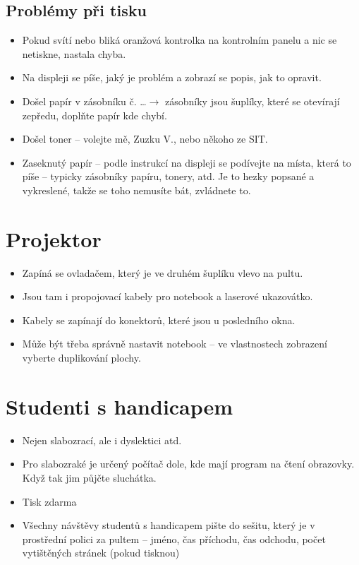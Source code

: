 \documentclass{article}
\begin{document}
\subsection{Problémy při tisku}
\begin{itemize}
  \item Pokud svítí nebo bliká oranžová kontrolka na kontrolním panelu a nic se netiskne, nastala chyba.
  \item Na displeji se píše, jaký je problém a zobrazí se popis, jak to opravit.
  \item Došel papír v zásobníku č. \ldots $\rightarrow$ zásobníky jsou šuplíky, které se otevírají zepředu, doplňte papír kde chybí.
  \item Došel toner -- volejte mě, Zuzku V., nebo někoho ze SIT.
  \item Zaseknutý papír -- podle instrukcí na displeji se podívejte na místa, která to píše -- typicky zásobníky papíru, tonery, atd. Je to hezky popsané a vykreslené, takže se toho nemusíte bát, zvládnete to.
  \end{itemize}
\section{Projektor}

\begin{itemize}
\item  Zapíná se ovladačem, který je ve druhém šuplíku vlevo na pultu.
\item  Jsou tam i propojovací kabely pro notebook a laserové ukazovátko.
\item  Kabely se zapínají do konektorů, které jsou u posledního okna.
\item  Může být třeba správně nastavit notebook -- ve vlastnostech zobrazení vyberte duplikování plochy.
\end{itemize}

\section{Studenti s handicapem}

\begin{itemize}
\item Nejen slabozrací, ale i dyslektici atd.
\item Pro slabozraké je určený počítač dole, kde mají program na čtení obrazovky. Když tak jim půjčte sluchátka.
\item Tisk zdarma
\item Všechny návštěvy studentů s handicapem pište do sešitu, který je v prostřední polici za pultem -- jméno, čas příchodu, čas odchodu,
počet vytištěných stránek (pokud tisknou)
\end{itemize}
\end{document}

